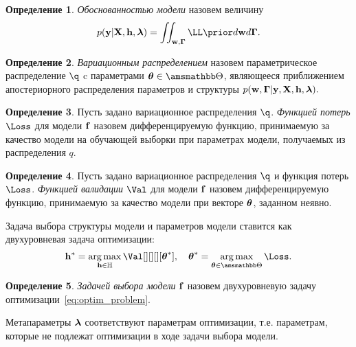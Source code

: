 \documentclass[11pt, a5paper]{dissert}
\theoremstyle{definition}
\newtheorem{defin}{Определение}
\DeclareMathOperator*{\argmax}{arg\,max}
\begin{document}
\begin{defin}
\textit{Обоснованностью модели }назовем величину
\begin{equation}
\label{eq:evidence}
\EV = \iint_{\mathbf{w}, \boldsymbol{\Gamma}} \LL \prior  d\mathbf{w}d\boldsymbol{\Gamma}.
\end{equation}
\end{defin}


\begin{defin}
\textit{Вариационным распределением} назовем параметрическое распределение $\q$ c параметрами $\teta \in \Tetab$, являющееся приближением  апостериорного распределения параметров и структуры $p(\mathbf{w}, \boldsymbol{\Gamma}|\mathbf{y}, \mathbf{X}, \mathbf{h},\boldsymbol{\lambda}).$ 
\end{defin}



\begin{defin}
\label{def:l}
Пусть задано вариационное распределения $\q$.
\textit{Функцией потерь} $\Loss$ для модели $\mathbf{f}$ назовем дифференцируемую функцию, принимаемую за качество модели на обучающей выборки при параметрах модели, получаемых из  распределения $q$.
\end{defin}

\begin{defin}
\label{def:q}
Пусть задано вариационное распределения $\q$ и функция потерь $\Loss$. 
\textit{Функцией валидации} $\Val$ для модели $\mathbf{f}$ назовем дифференцируемую функцию, принимаемую за качество модели при векторе $\boldsymbol{\theta}$, заданном неявно.
\end{defin}

 

Задача выбора структуры модели и параметров модели ставится как двухуровневая задача оптимизации:
\begin{equation}
\label{eq:optim_problem}
	\h^{*} = \argmax_{\h  \in \Hb} \Val[][][][\teta^{*}], \quad   \teta^{*} = \argmax_{\teta \in \Tetab} \Loss.
\end{equation}

\begin{defin}
\textit{Задачей выбора модели} $\mathbf{f}$ назовем   двухуровневую задачу оптимизации~\eqref{eq:optim_problem}.
\end{defin}

Метапараметры $\boldsymbol{\lambda}$ соответствуют параметрам оптимизации, т.е. параметрам, которые не подлежат оптимизации в ходе задачи выбора модели. 
\end{document}
